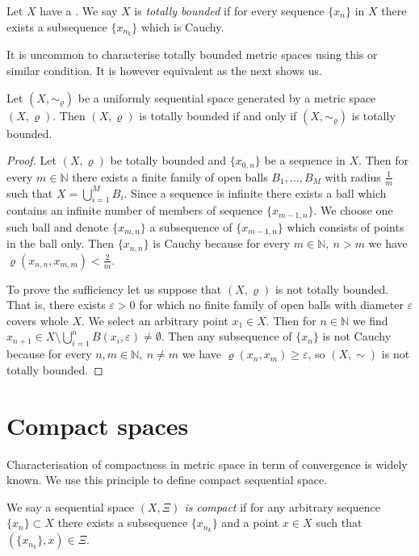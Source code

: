 \begin{define}\label{def:stb}
	Let $X$ have a \uss. We say $X$ is \emph{totally bounded} if for every sequence $\{x_n\}$ in $X$ there exists a subsequence $\{x_{n_k}\}$ which is Cauchy.
\end{define}

It is uncommon to characterise totally bounded metric spaces using this or similar condition. It is however equivalent as the next shows us.

\begin{theorem} \label{th:stbtb}
	Let $(X,\sim_\varrho)$ be a uniformly sequential space generated by a metric space $(X,\varrho)$. Then $(X,\varrho)$ is totally bounded if and only if $(X,\sim_\varrho)$ is totally bounded.
\end{theorem}
\begin{proof}
Let $(X,\varrho)$ be totally bounded and $\{x_{0,n}\}$ be a sequence in $X$. Then for every $m\in \mathbb{N}$ there exists a finite family of open balls $B_1, \dots, B_M$ with radius $\frac{1}{m}$ such that $X=\bigcup_{i=1}^MB_i$. Since a sequence is infinite there exists a ball which contains an infinite number of members of sequence $\{x_{m-1,n}\}$. We choose one such ball and denote $\{x_{m,n}\}$ a subsequence of $\{x_{m-1,n}\}$ which consists of points in the ball only. Then $\{x_{n,n}\}$ is Cauchy because for every $m\in \mathbb{N},\ n>m$ we have $\varrho(x_{n,n},x_{m,m})<\frac{2}{m}$.

To prove the sufficiency let us suppose that $(X,\varrho)$ is not totally bounded. That is, there exists $\varepsilon>0$ for which no finite family of open balls with diameter $\varepsilon$ covers whole $X$. We select an arbitrary point $x_1\in X$. Then for $n\in \mathbb{N}$ we find $x_{n+1}\in X\setminus\bigcup_{i=1}^n B(x_i, \varepsilon)\ne\emptyset$. Then any subsequence of $\{x_n\}$ is not Cauchy because for every $n, m\in \mathbb{N},\ n\ne m$ we have $\varrho(x_n,x_m)\ge\varepsilon$, so $(X,\sim)$ is not totally bounded.
\end{proof}

\section{Compact spaces}

Characterisation of compactness in metric space in term of convergence is widely known. We use this principle to define compact sequential space.

\begin{define}\label{def:cmp}
We say a sequential space \emph{$(X,\Xi)$ is compact} if for any arbitrary sequence $\{x_n\}\subset X$ there exists a subsequence $\{x_{n_k}\}$ and a point $x\in X$ such that $(\{x_{n_k}\}, x)\in\Xi$.
\end{define}

